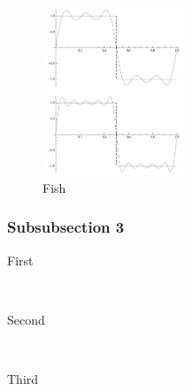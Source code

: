 \documentclass[12pt]{article} %
\begin{document}
\lipsum[6] %
\begin{figure} %
  \begin{center}
    \includegraphics[width=0.38\textwidth]{fourier}
  \end{center}
  \caption{Fish}
\end{figure}
\lipsum[7-8] %


\subsubsection{Subsubsection 3} %

\begin{description} %

\item[First] \hfill \\
\lipsum[9] %

\item[Second] \hfill \\
\lipsum[10] %

\item[Third] \hfill \\
\lipsum[11] %

\end{description} 



\end{document}
